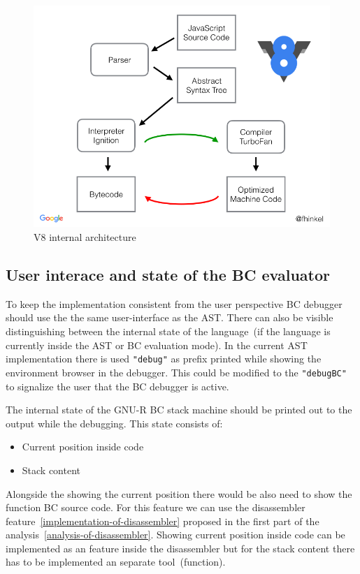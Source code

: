 \documentclass[thesis=M,english]{FITthesis}[2018/10/20]
\newcommand{\code}[1]{\texttt{#1}}
\begin{document}
\begin{figure}\centering
	\includegraphics[width=\textwidth]{v8-architecture}
	\caption{V8 internal architecture}\label{fig:ast-v8-architecture}
\end{figure}

\subsection{User interace and state of the BC evaluator}\label{user-interface-and-state-of-the-bc-eval}

To keep the implementation consistent from the user perspective BC debugger should use the the same user-interface as the AST. There can also be visible distinguishing between the internal state of the language~(if the language is currently inside the AST or BC evaluation mode). In the current AST implementation there is used 
\code{"debug"} as prefix printed while showing the environment browser in the debugger. This could be modified to the \code{"debugBC"} to signalize the user that the BC debugger is active.

The internal state of the GNU-R BC stack machine should be printed out to the output while the debugging. This state consists of:

\begin{itemize}
	\item Current position inside code
	\item Stack content
\end{itemize}

Alongside the showing the current position there would be also need to show the function BC source code. For this feature we can use the disassembler feature~\ref{implementation-of-disassembler} proposed in the first part of the analysis~\ref{analysis-of-disassembler}. Showing current position inside code can be implemented as an feature inside the disassembler but for the stack content there has to be implemented an separate tool~(function).
\end{document}
